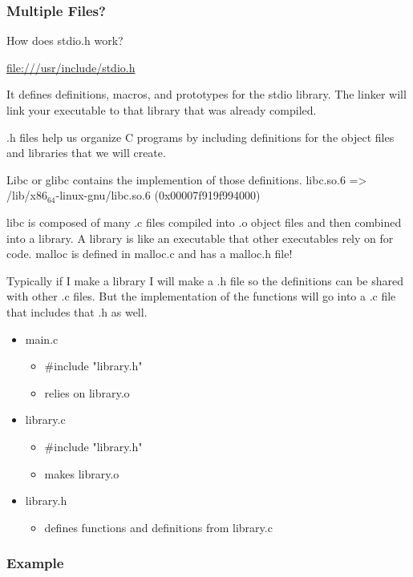 \documentclass[11pt]{article}
\begin{document}
\subsubsection{Multiple Files?}
\label{sec:org8374010}

How does stdio.h work?

\url{file:///usr/include/stdio.h}

It defines definitions, macros, and prototypes for the stdio library.
The linker will link your executable to that library that was already
compiled.

.h files help us organize C programs by including definitions for the
object files and libraries that we will create.

Libc or glibc contains the implemention of those definitions.
libc.so.6 => /lib/x86\(_{\text{64}}\)-linux-gnu/libc.so.6 (0x00007f919f994000)

libc is composed of many .c files compiled into .o object files and
then combined into a library. A library is like an executable that
other executables rely on for code. malloc is defined in malloc.c and
has a malloc.h file!

Typically if I make a library I will make a .h file so the definitions
can be shared with other .c files. But the implementation of the functions
will go into a .c file that includes that .h as well.

\begin{itemize}
\item main.c
\begin{itemize}
\item \#include "library.h"
\item relies on library.o
\end{itemize}
\item library.c
\begin{itemize}
\item \#include "library.h"
\item makes library.o
\end{itemize}
\item library.h
\begin{itemize}
\item defines functions and definitions from library.c
\end{itemize}
\end{itemize}

\subsubsection{Example}
\label{sec:org6f39f1b}
\end{document}
